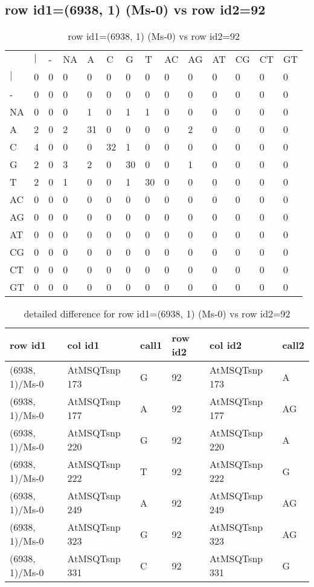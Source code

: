 \subsection{row id1=(6938, 1) (Ms-0) vs row id2=92}
\begin{center}
\begin{longtable}{|l|l|l|l|l|l|l|l|l|l|l|l|l|l|}
\caption{row id1=(6938, 1) (Ms-0) vs row id2=92} \label{table_dm144}\\
\hline
\\
\hline
&$|$&-&NA&A&C&G&T&AC&AG&AT&CG&CT&GT\\
$|$&0&0&0&0&0&0&0&0&0&0&0&0&0\\
-&0&0&0&0&0&0&0&0&0&0&0&0&0\\
NA&0&0&0&1&0&1&1&0&0&0&0&0&0\\
A&2&0&2&31&0&0&0&0&2&0&0&0&0\\
C&4&0&0&0&32&1&0&0&0&0&0&0&0\\
G&2&0&3&2&0&30&0&0&1&0&0&0&0\\
T&2&0&1&0&0&1&30&0&0&0&0&0&0\\
AC&0&0&0&0&0&0&0&0&0&0&0&0&0\\
AG&0&0&0&0&0&0&0&0&0&0&0&0&0\\
AT&0&0&0&0&0&0&0&0&0&0&0&0&0\\
CG&0&0&0&0&0&0&0&0&0&0&0&0&0\\
CT&0&0&0&0&0&0&0&0&0&0&0&0&0\\
GT&0&0&0&0&0&0&0&0&0&0&0&0&0\\
\hline
\end{longtable}
\end{center}

\begin{center}
\begin{longtable}{|l|l|l|l|l|l|}
\caption{detailed difference for row id1=(6938, 1) (Ms-0) vs row id2=92} \label{table_dm145}\\
\hline
row id1&col id1&call1&row id2&col id2&call2\\
\hline
(6938, 1)/Ms-0&AtMSQTsnp 173&G&92&AtMSQTsnp 173&A\\
(6938, 1)/Ms-0&AtMSQTsnp 177&A&92&AtMSQTsnp 177&AG\\
(6938, 1)/Ms-0&AtMSQTsnp 220&G&92&AtMSQTsnp 220&A\\
(6938, 1)/Ms-0&AtMSQTsnp 222&T&92&AtMSQTsnp 222&G\\
(6938, 1)/Ms-0&AtMSQTsnp 249&A&92&AtMSQTsnp 249&AG\\
(6938, 1)/Ms-0&AtMSQTsnp 323&G&92&AtMSQTsnp 323&AG\\
(6938, 1)/Ms-0&AtMSQTsnp 331&C&92&AtMSQTsnp 331&G\\
\hline
\end{longtable}
\end{center}


